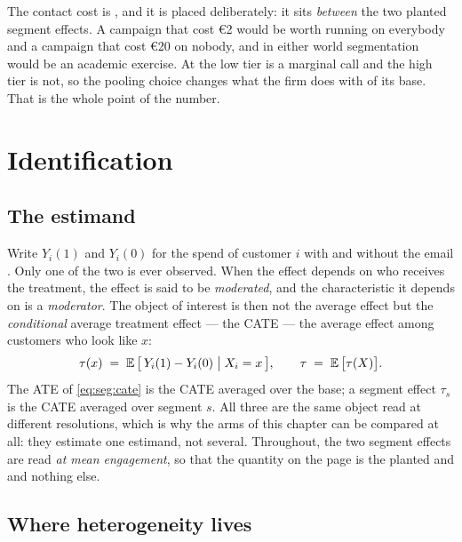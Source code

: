 The contact cost is \eur{\nbTwoCost}, and it is placed deliberately: it sits \emph{between} the two
planted segment effects. A campaign that cost €2 would be worth running on everybody and a campaign
that cost €20 on nobody, and in either world segmentation would be an academic exercise. At
\eur{\nbTwoCost} the low tier is a marginal call and the high tier is not, so the pooling choice
changes what the firm does with \pc{\nbTwoShareLow} of its base. That is the whole point of the
number.

\section{Identification}
\label{sec:seg:ident}

\subsection*{The estimand}

Write $Y_i(1)$ and $Y_i(0)$ for the spend of customer $i$ with and without the email
\citep{rubin1974, imbens2015}. Only one of the two is ever observed. When the effect depends on who
receives the treatment, the effect is said to be \emph{moderated}, and the characteristic it depends
on is a \emph{moderator}. The object of interest is then not the average effect but the
\emph{conditional} average treatment effect --- the CATE --- the average effect among customers who
look like $x$:
%
\begin{equation}
  \tau(x) \;=\; \operatorname{\mathbb{E}}\big[\,Y_i(1) - Y_i(0) \;\big|\; X_i = x\,\big],
  \qquad
  \tau \;=\; \operatorname{\mathbb{E}}\big[\tau(X)\big] .
  \label{eq:seg:cate}
\end{equation}
%
The ATE of \cref{eq:seg:cate} is the CATE averaged over the base; a segment effect $\tau_s$ is the
CATE averaged over segment $s$. All three are the same object read at different resolutions, which
is why the arms of this chapter can be compared at all: they estimate one estimand, not several.
Throughout, the two segment effects are read \emph{at mean engagement}, so that the quantity on the
page is the planted \eur{\nbTwoTrueLow} and \eur{\nbTwoTrueHigh} and nothing else.

\subsection*{Where heterogeneity lives}

